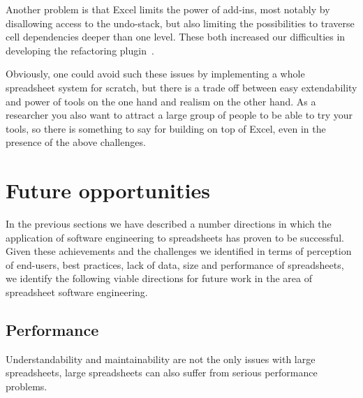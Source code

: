\documentclass[conference]{IEEEtran}
\begin{document}
Another problem is that Excel limits the power of add-ins, most notably by disallowing access to the undo-stack, but also limiting the possibilities to traverse cell dependencies deeper than one level. These both increased our difficulties in developing the refactoring plugin~\cite{hermans_bumblebee:_2014}.

Obviously, one could avoid such these issues by implementing a whole spreadsheet system for scratch, but there is a trade off between easy extendability and power of tools on the one hand and realism on the other hand. As a researcher you also want to attract a large group of people to be able to try your tools, so there is something to say for building on top of Excel, even in the presence of the above challenges.


\section{Future opportunities}
In the previous sections we have described a number directions in which the application of software engineering to spreadsheets  has proven to be successful. Given these achievements and the challenges we identified in terms of perception of end-users, best practices, lack of data, size and performance of spreadsheets, we identify the following viable directions for future work in the area of spreadsheet software engineering.


\subsection{Performance}
Understandability and maintainability are not the only issues with large spreadsheets, large spreadsheets can also suffer from serious performance problems. 
\end{document}
